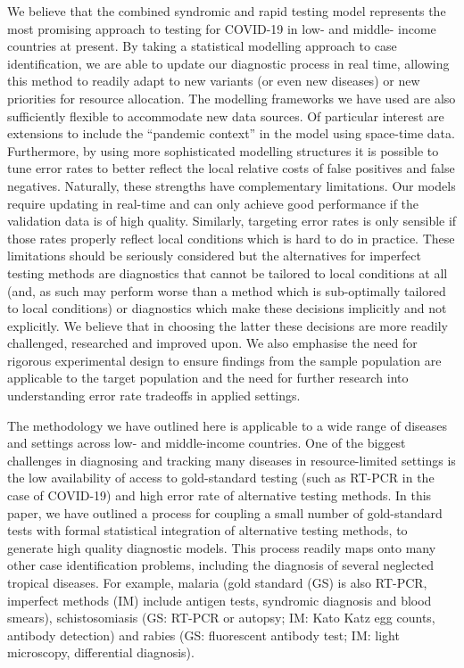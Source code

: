 \documentclass[]{elsarticle} %
\begin{document}
We believe that the combined syndromic and rapid testing model
represents the most promising approach to testing for COVID-19 in low-
and middle- income countries at present. By taking a statistical
modelling approach to case identification, we are able to update our
diagnostic process in real time, allowing this method to readily adapt
to new variants (or even new diseases) or new priorities for resource
allocation. The modelling frameworks we have used are also sufficiently
flexible to accommodate new data sources. Of particular interest are
extensions to include the ``pandemic context'' in the model using
space-time data. Furthermore, by using more sophisticated modelling
structures it is possible to tune error rates to better reflect the
local relative costs of false positives and false negatives. Naturally,
these strengths have complementary limitations. Our models require
updating in real-time and can only achieve good performance if the
validation data is of high quality. Similarly, targeting error rates is
only sensible if those rates properly reflect local conditions which is
hard to do in practice. These limitations should be seriously considered
but the alternatives for imperfect testing methods are diagnostics that
cannot be tailored to local conditions at all (and, as such may perform
worse than a method which is sub-optimally tailored to local conditions)
or diagnostics which make these decisions implicitly and not explicitly.
We believe that in choosing the latter these decisions are more readily
challenged, researched and improved upon. We also emphasise the need for
rigorous experimental design to ensure findings from the sample
population are applicable to the target population and the need for
further research into understanding error rate tradeoffs in applied
settings.

The methodology we have outlined here is applicable to a wide range of
diseases and settings across low- and middle-income countries. One of
the biggest challenges in diagnosing and tracking many diseases in
resource-limited settings is the low availability of access to
gold-standard testing (such as RT-PCR in the case of COVID-19) and high
error rate of alternative testing methods. In this paper, we have
outlined a process for coupling a small number of gold-standard tests
with formal statistical integration of alternative testing methods, to
generate high quality diagnostic models. This process readily maps onto
many other case identification problems, including the diagnosis of
several neglected tropical diseases. For example, malaria (gold standard
(GS) is also RT-PCR, imperfect methods (IM) include antigen tests,
syndromic diagnosis and blood smears), schistosomiasis (GS: RT-PCR or
autopsy; IM: Kato Katz egg counts, antibody detection) and rabies (GS:
fluorescent antibody test; IM: light microscopy, differential
diagnosis).
\end{document}
